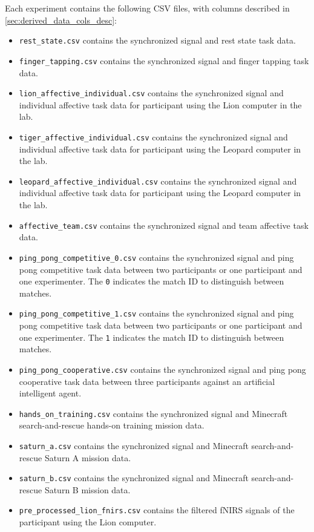 Each experiment contains the following CSV files, with columns described in \ref{sec:derived_data_cols_desc}:
\begin{itemize}
  \item \texttt{rest\_state.csv} contains the synchronized signal and rest state task data.
  \item \texttt{finger\_tapping.csv} contains the synchronized signal and finger tapping task data.
  \item \texttt{lion\_affective\_individual.csv} contains the synchronized signal and individual affective task data for participant using the Lion computer in the lab.
  \item \texttt{tiger\_affective\_individual.csv} contains the synchronized signal and individual affective task data for participant using the Leopard computer in the lab.
  \item \texttt{leopard\_affective\_individual.csv} contains the synchronized signal and individual affective task data for participant using the Leopard computer in the lab.
  \item \texttt{affective\_team.csv} contains the synchronized signal and team affective task data.
  \item \texttt{ping\_pong\_competitive\_0.csv} contains the synchronized signal and ping pong competitive task data between two participants or one participant and one experimenter. The \texttt{0} indicates the match ID to distinguish between matches.
  \item \texttt{ping\_pong\_competitive\_1.csv} contains the synchronized signal and ping pong competitive task data between two participants or one participant and one experimenter. The \texttt{1} indicates the match ID to distinguish between matches.
  \item \texttt{ping\_pong\_cooperative.csv} contains the synchronized signal and ping pong cooperative task data between three participants against an artificial intelligent agent.
  \item \texttt{hands\_on\_training.csv} contains the synchronized signal and Minecraft search-and-rescue hands-on training mission data.
  \item \texttt{saturn\_a.csv} contains the synchronized signal and Minecraft search-and-rescue Saturn A mission data.
  \item \texttt{saturn\_b.csv} contains the synchronized signal and Minecraft search-and-rescue Saturn B mission data.
  \item \texttt{pre\_processed\_lion\_fnirs.csv}  contains the filtered fNIRS signals of the participant using the Lion computer.

\end{itemize}
